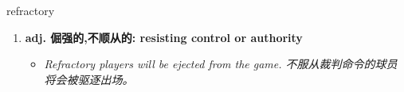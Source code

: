 
\begin{frame}
{\huge refractory}
\begin{center}
\begin{enumerate}\Large
  \item \textbf{adj. 倔强的,不顺从的: resisting control or authority}
  \begin{itemize}
    \item \em{\Large{Refractory players will be ejected from the game. 不服从裁判命令的球员将会被驱逐出场。}}
  \end{itemize}
\end{enumerate}
\end{center}
\end{frame}
